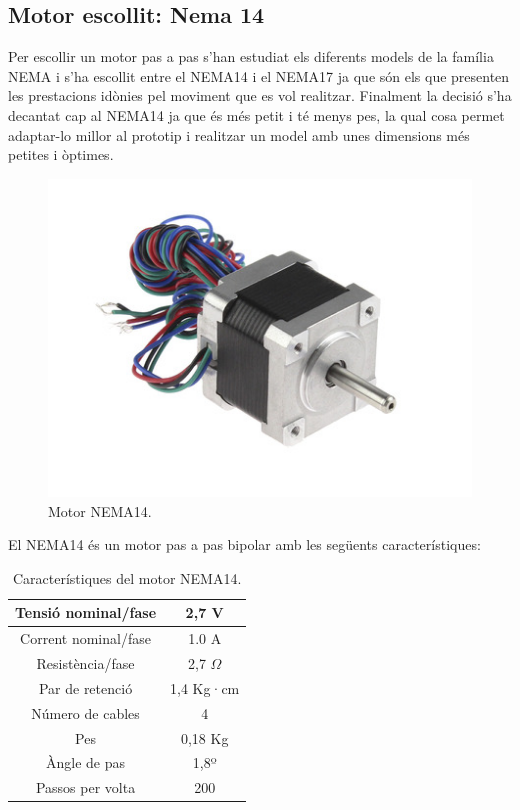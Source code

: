\subsection{Motor escollit: Nema 14}
Per escollir un motor pas a pas s'han estudiat els diferents models de la família NEMA i s'ha escollit entre el NEMA14 i el NEMA17 ja que són els que presenten les prestacions idònies pel moviment que es vol realitzar. Finalment la decisió s'ha decantat cap al NEMA14 ja que és més petit i té menys pes, la qual cosa permet adaptar-lo millor al prototip i realitzar un model amb unes dimensions més petites i òptimes. 

\begin{figure}[H]
	\centering
	\includegraphics[scale=2]{NEMA14}
	\caption{Motor NEMA14.}
	\label{fig:NEMA14}
\end{figure}

El NEMA14 és un motor pas a pas bipolar amb les següents característiques: 

\begin{table}[htbp]
	\begin{center}
		\begin{tabular}{|c|c|}
			\hline
			
			Tensió nominal/fase & 2,7 V  \\ \hline
			Corrent nominal/fase & 1.0 A  \\ \hline
			Resistència/fase & 2,7 $\Omega$  \\ \hline
			Par de retenció & 1,4 Kg·cm  \\ \hline
			Número de cables & 4  \\ \hline
			Pes & 0,18 Kg  \\ \hline
			Àngle de pas & 1,8º  \\ \hline
			Passos per volta & 200  \\ \hline
		\end{tabular}
		\caption{Característiques del motor NEMA14.}
		\label{tabla:NEMA14}
	\end{center}
\end{table}



